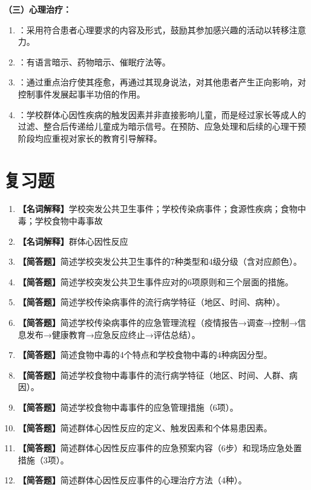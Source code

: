\begin{keybox}
\textbf{（三）心理治疗：}
\begin{enumerate}[leftmargin=*]
    \item {}：采用符合患者心理要求的内容及形式，鼓励其参加感兴趣的活动以转移注意力。
    \item {}：有语言暗示、药物暗示、催眠疗法等。
    \item {}：通过重点治疗使其痊愈，再通过其现身说法，对其他患者产生正向影响，对控制事件发展起事半功倍的作用。
    \item {}：学校群体心因性疾病的触发因素并非直接影响儿童，而是经过家长等成人的过滤、整合后传递给儿童成为暗示信号。在预防、应急处理和后续的心理干预阶段均应重视对家长的教育引导解释。
\end{enumerate}
\end{keybox}

\section{复习题}

\begin{enumerate}[leftmargin=*, itemsep=8pt]
    \item \textbf{【名词解释】}学校突发公共卫生事件；学校传染病事件；食源性疾病；食物中毒；学校食物中毒事故
    \item \textbf{【名词解释】}群体心因性反应
    \item \textbf{【简答题】}简述学校突发公共卫生事件的7种类型和4级分级（含对应颜色）。
    \item \textbf{【简答题】}简述学校突发公共卫生事件应对的6项原则和三个层面的措施。
    \item \textbf{【简答题】}简述学校传染病事件的流行病学特征（地区、时间、病种）。
    \item \textbf{【简答题】}简述学校传染病事件的应急管理流程（疫情报告→调查→控制→信息发布→健康教育→应急反应终止→评估总结）。
    \item \textbf{【简答题】}简述食物中毒的4个特点和学校食物中毒的4种病因分型。
    \item \textbf{【简答题】}简述学校食物中毒事件的流行病学特征（地区、时间、人群、病因）。
    \item \textbf{【简答题】}简述学校食物中毒事件的应急管理措施（6项）。
    \item \textbf{【简答题】}简述群体心因性反应的定义、触发因素和个体易患因素。
    \item \textbf{【简答题】}简述群体心因性反应事件的应急预案内容（6步）和现场应急处置措施（3项）。
    \item \textbf{【简答题】}简述群体心因性反应事件的心理治疗方法（4种）。
\end{enumerate}

